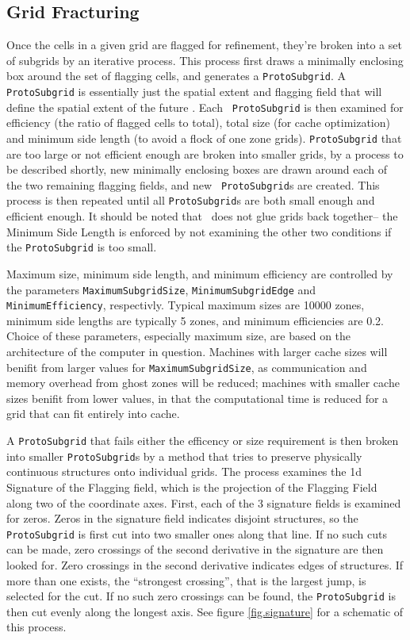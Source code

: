 \subsection{Grid Fracturing}\label{app.subgrid_creation}
Once the cells in a given grid are flagged for refinement, they're
broken into a set of subgrids by an iterative process.  This process
first draws a minimally enclosing box around the set of flagging
cells, and generates a {\tt ProtoSubgrid}.  A {\tt ProtoSubgrid} is
essentially just the spatial extent and flagging field that will
define the spatial extent of the future \grid.  Each {\tt
  ProtoSubgrid} is then examined for efficiency (the ratio of flagged cells to
total), total size (for cache optimization) and minimum side
length (to avoid a flock of one zone grids).  {\tt ProtoSubgrid} that are too
large or not efficient enough are broken into smaller grids, by a
process to be described shortly, new minimally enclosing boxes are
drawn around each of the two remaining flagging fields, and new {\tt
  ProtoSubgrid}s are created.  This process is then repeated until
all {\tt ProtoSubgrid}s are both small enough and efficient enough.
It should be noted that \enzo\ does not glue grids back together-- the
Minimum Side Length is enforced by not examining the other two
conditions if the {\tt ProtoSubgrid} is too small.  

Maximum size, minimum side length,  and minimum efficiency are
controlled by the parameters {\tt MaximumSubgridSize}, {\tt MinimumSubgridEdge} and {\tt
  MinimumEfficiency}, respectivly. Typical maximum sizes are 10000 zones, minimum
side lengths are typically 5 zones, and minimum efficiencies are  0.2.
Choice of these parameters, especially maximum size, are
based on the architecture of the computer in question.  
Machines with larger cache sizes will benifit from larger values for
{\tt MaximumSubgridSize}, as communication and memory overhead from
ghost zones will be reduced; machines with smaller cache sizes benifit
from lower values, in that the computational time is reduced for a
grid that can fit entirely into cache.  

A {\tt ProtoSubgrid} that fails either the efficency or size
requirement is then broken into smaller {\tt ProtoSubgrid}s by a
method that tries to preserve physically continuous structures onto
individual grids.  The process examines the 1d Signature of the Flagging
field, which is the projection of the Flagging Field along two of the
coordinate axes.  First, each of the 3 signature fields is examined
for zeros.  Zeros in the signature field indicates disjoint
structures, so the {\tt ProtoSubgrid} is first cut into two smaller
ones along that line.  If no such cuts can be made, zero crossings of
the second derivative in the signature are then looked for.  Zero
crossings in the second derivative indicates edges of structures.  If
more than one exists, the ``strongest crossing'', that is the largest
jump, is selected for the cut.  If no such zero crossings can be
found, the {\tt ProtoSubgrid} is then cut evenly along the longest
axis.  See figure \ref{fig.signature} for a schematic of this process.

